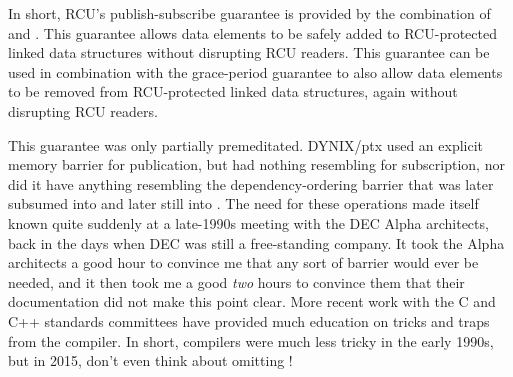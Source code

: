 \QuickQuizEnd

In short, RCU's publish-subscribe guarantee is provided by the
combination of  and .
This
guarantee allows data elements to be safely added to RCU-protected
linked data structures without disrupting RCU readers.
This guarantee
can be used in combination with the grace-period guarantee to also allow
data elements to be removed from RCU-protected linked data structures,
again without disrupting RCU readers.

This guarantee was only partially premeditated.
DYNIX/ptx used an
explicit memory barrier for publication, but had nothing resembling
 for subscription, nor did it have anything
resembling the dependency-ordering barrier that was later subsumed
into  and later still into .
The
need for these operations made itself known quite suddenly at a
late-1990s meeting with the DEC Alpha architects, back in the days when
DEC was still a free-standing company.
It took the Alpha architects a
good hour to convince me that any sort of barrier would ever be needed,
and it then took me a good \emph{two} hours to convince them that their
documentation did not make this point clear.
More recent work with the C
and C++ standards committees have provided much education on tricks and
traps from the compiler.
In short, compilers were much less tricky in
the early 1990s, but in 2015, don't even think about omitting
!


